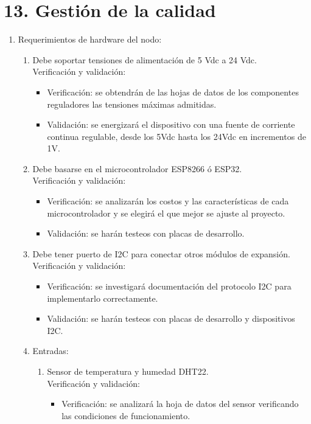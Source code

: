 \documentclass[11pt]{charter}
\begin{document}
\section{13. Gestión de la calidad}
\label{sec:calidad}

\begin{enumerate}
\item Requerimientos de hardware del nodo:
	\begin{enumerate}
	\item Debe soportar tensiones de alimentación de 5 Vdc a 24 Vdc.
		\\Verificación y validación:
		\begin{itemize}
		\item Verificación: se obtendrán de las hojas de datos de los componentes reguladores las tensiones máximas admitidas. 
		\item Validación: se energizará el dispositivo con una fuente de corriente continua regulable, desde los 5Vdc hasta los 24Vdc en incrementos de 1V. 
		\end{itemize}
	\item Debe basarse en el microcontrolador ESP8266 ó ESP32.
	\\Verificación y validación:
		\begin{itemize}
		\item Verificación: se analizarán los costos y las características de cada microcontrolador y se elegirá el que mejor se ajuste al proyecto.
		\item Validación: se harán testeos con placas de desarrollo.
		\end{itemize}
	\item Debe tener puerto de I2C para conectar otros módulos de expansión.
		\\Verificación y validación:
		\begin{itemize}
		\item Verificación: se investigará documentación del protocolo I2C para implementarlo correctamente.
		\item Validación: se harán testeos con placas de desarrollo y dispositivos I2C.
		\end{itemize}
	\item Entradas:
		\begin{enumerate}
		\item Sensor de temperatura y humedad DHT22.
			\\Verificación y validación:
			\begin{itemize}
			\item Verificación: se analizará la hoja de datos del sensor verificando las condiciones de funcionamiento.

\end{itemize}
\end{enumerate}
\end{enumerate}
\end{enumerate}
\end{document}
